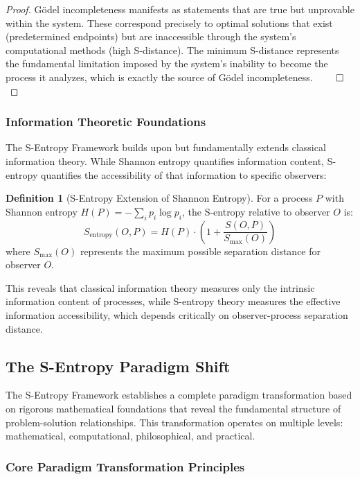 \documentclass[11pt]{article}
\theoremstyle{definition}
\newtheorem{definition}[theorem]{Definition}
\theoremstyle{remark}
\begin{document}
\begin{proof}
Gödel incompleteness manifests as statements that are true but unprovable within the system. These correspond precisely to optimal solutions that exist (predetermined endpoints) but are inaccessible through the system's computational methods (high S-distance). The minimum S-distance represents the fundamental limitation imposed by the system's inability to become the process it analyzes, which is exactly the source of Gödel incompleteness. $\qed$
\end{proof}

\subsubsection{Information Theoretic Foundations}

The S-Entropy Framework builds upon but fundamentally extends classical information theory. While Shannon entropy quantifies information content, S-entropy quantifies the accessibility of that information to specific observers:

\begin{definition}[S-Entropy Extension of Shannon Entropy]
For a process $P$ with Shannon entropy $H(P) = -\sum_i p_i \log p_i$, the S-entropy relative to observer $O$ is:
\begin{equation}
S_{\text{entropy}}(O, P) = H(P) \cdot \left(1 + \frac{S(O, P)}{S_{\text{max}}(O)}\right)
\end{equation}
where $S_{\text{max}}(O)$ represents the maximum possible separation distance for observer $O$.
\end{definition}

This reveals that classical information theory measures only the intrinsic information content of processes, while S-entropy theory measures the effective information accessibility, which depends critically on observer-process separation distance.

\subsection{The S-Entropy Paradigm Shift}

The S-Entropy Framework establishes a complete paradigm transformation based on rigorous mathematical foundations that reveal the fundamental structure of problem-solution relationships. This transformation operates on multiple levels: mathematical, computational, philosophical, and practical.

\subsubsection{Core Paradigm Transformation Principles}
\end{document}
